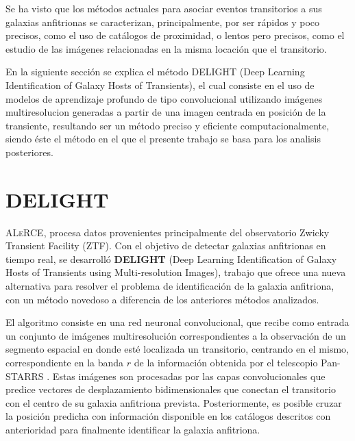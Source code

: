 \documentclass[../tesis.tex]{subfiles}
\begin{document}
Se ha visto que los métodos actuales para asociar eventos transitorios a sus galaxias anfitrionas se caracterizan, principalmente, por ser rápidos y poco precisos, como el uso de catálogos de proximidad, o lentos pero precisos, como el estudio de las imágenes relacionadas en la misma locación que el transitorio.\par\null\par

En la siguiente sección se explica el método DELIGHT (Deep Learning Identification of Galaxy Hosts of Transients), el cual consiste en el uso de modelos de aprendizaje profundo de tipo convolucional utilizando imágenes multiresolucion generadas a partir de una imagen centrada en posición de la transiente, resultando ser un método preciso y eficiente computacionalmente, siendo éste el método en el que el presente trabajo se basa para los analisis posteriores.\par\null\par

\section{DELIGHT} \label{introduction:delight}

\textsc{ALeRCE}, procesa datos provenientes principalmente del observatorio Zwicky Transient Facility (\textsc{ZTF}). Con el objetivo de detectar galaxias anfitrionas en tiempo real, se desarrolló \textbf{DELIGHT} (Deep Learning Identification of Galaxy Hosts of Transients using Multi-resolution Images), trabajo que ofrece una nueva alternativa para resolver el problema de identificación de la galaxia anfitriona, con un método novedoso a diferencia de los anteriores métodos analizados.\par\null\par

El algoritmo consiste en una red neuronal convolucional, que recibe como entrada un conjunto de imágenes multiresolución correspondientes a la observación de un segmento espacial en donde esté localizada un transitorio, centrando en el mismo, correspondiente en la banda $r$ de la información obtenida por el telescopio Pan-STARRS \cite{panstarrs}. Estas imágenes son procesadas por las capas convolucionales que predice vectores de desplazamiento bidimensionales que conectan el transitorio con el centro de su galaxia anfitriona prevista. Posteriormente, es posible cruzar la posición predicha con información disponible en los catálogos descritos con anterioridad para finalmente identificar la galaxia anfitriona.\par\null\par
\end{document}
